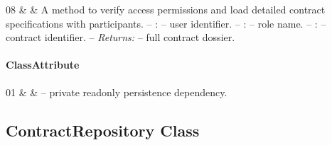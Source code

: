 \begin{ClassMethodTable}
08 & \newline{}\newline{} &
A method to verify access permissions and load detailed contract specifications with participants.
\newline -- :  -- user identifier.
\newline -- :  -- role name.
\newline -- :  -- contract identifier.
\newline -- \textit{Returns:}  -- full contract dossier. \\ \hline
\end{ClassMethodTable}

\paragraph{ClassAttribute}
\begin{ClassAttributeTable}
01 &  &  -- private readonly persistence dependency. \\ \hline
\end{ClassAttributeTable}

\subsection{ContractRepository Class}

